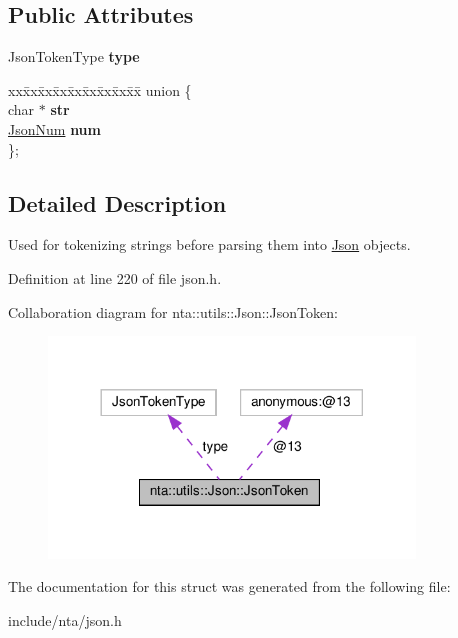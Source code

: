 \subsection*{Public Attributes}
\begin{DoxyCompactItemize}
\item 
\mbox{\label{structnta_1_1utils_1_1Json_1_1JsonToken_ab0bf0cda189a3063f326abcbf57532bb}} 
Json\+Token\+Type {\bfseries type}
\item 
\mbox{\label{structnta_1_1utils_1_1Json_1_1JsonToken_a7123d444ecb1662248a2b54d4f27d087}} 
\begin{tabbing}
xx\=xx\=xx\=xx\=xx\=xx\=xx\=xx\=xx\=\kill
union \{\\
\mbox{\label{structnta_1_1utils_1_1Json_1_1JsonToken_a249048bb34d397d9f9034391f07e8666}} 
char $\ast$ {\bfseries str}\\
\mbox{\label{structnta_1_1utils_1_1Json_1_1JsonToken_a276868d3bfc600a8e9b00a9719d09122}} 
\hyperlink{classnta_1_1utils_1_1JsonNum}{JsonNum} {\bfseries num}\\
\}; \\

\end{tabbing}\end{DoxyCompactItemize}


\subsection{Detailed Description}
Used for tokenizing strings before parsing them into \hyperlink{classnta_1_1utils_1_1Json}{Json} objects. 

Definition at line 220 of file json.\+h.



Collaboration diagram for nta\+:\+:utils\+:\+:Json\+:\+:Json\+Token\+:\nopagebreak
\begin{figure}[H]
\begin{center}
\leavevmode
\includegraphics[width=276pt]{d9/d6a/structnta_1_1utils_1_1Json_1_1JsonToken__coll__graph}
\end{center}
\end{figure}


The documentation for this struct was generated from the following file\+:\begin{DoxyCompactItemize}
\item 
include/nta/json.\+h\end{DoxyCompactItemize}

